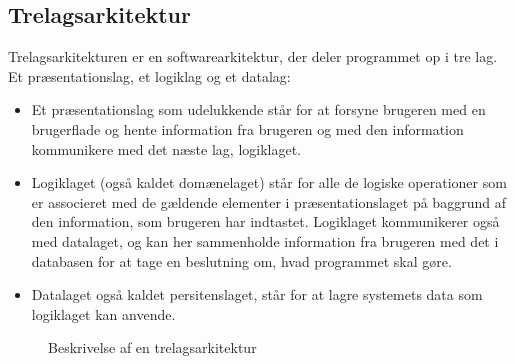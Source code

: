 \subsection{Trelagsarkitektur}
Trelagsarkitekturen er en softwarearkitektur, der deler programmet op i tre lag.
Et præsentationslag, et logiklag og et datalag: 
\begin{itemize}
    \item Et præsentationslag som udelukkende står for at forsyne brugeren med
        en brugerflade og hente information fra brugeren og med den information
        kommunikere med det næste lag, logiklaget.
    \item Logiklaget (også kaldet domænelaget) står for alle de logiske
        operationer som er associeret med de gældende elementer i
        præsentationslaget på baggrund af den information, som brugeren har
        indtastet. Logiklaget kommunikerer også med datalaget, og kan her
        sammenholde information fra brugeren med det i databasen for at tage en
        beslutning om, hvad programmet skal gøre.
    \item Datalaget også kaldet persitenslaget, står for at lagre systemets data som logiklaget kan anvende.
\end{itemize}


\begin{figure}[H]
    \centering
    \caption{Beskrivelse af en trelagsarkitektur}
    \label{fig:trelagsarkitekur}
\end{figure}

